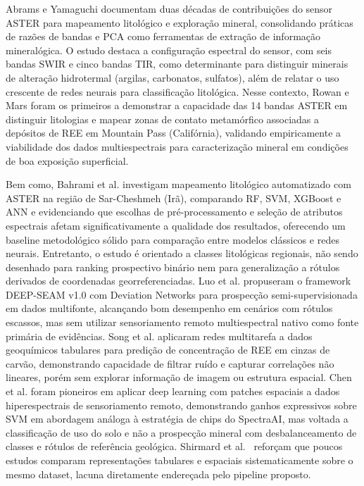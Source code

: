 \documentclass[12pt,twocolumn]{article}
\begin{document}
Abrams e Yamaguchi \cite{abrams2019} documentam duas décadas de contribuições do sensor ASTER para mapeamento litológico e exploração mineral, consolidando práticas de razões de bandas e PCA como ferramentas de extração de informação mineralógica. O estudo destaca a configuração espectral do sensor, com seis bandas SWIR e cinco bandas TIR, como determinante para distinguir minerais de alteração hidrotermal (argilas, carbonatos, sulfatos), além de relatar o uso crescente de redes neurais para classificação litológica. Nesse contexto, Rowan e Mars \cite{rowan2003} foram os primeiros a demonstrar a capacidade das 14 bandas ASTER em distinguir litologias e mapear zonas de contato metamórfico associadas a depósitos de REE em Mountain Pass (Califórnia), validando empiricamente a viabilidade dos dados multiespectrais para caracterização mineral em condições de boa exposição superficial.

Bem como, Bahrami et al. \cite{bahrami2024} investigam mapeamento litológico automatizado com ASTER na região de Sar-Cheshmeh (Irã), comparando RF, SVM, XGBoost e ANN e evidenciando que escolhas de pré-processamento e seleção de atributos espectrais afetam significativamente a qualidade dos resultados, oferecendo um baseline metodológico sólido para comparação entre modelos clássicos e redes neurais. Entretanto, o estudo é orientado a classes litológicas regionais, não sendo desenhado para ranking prospectivo binário nem para generalização a rótulos derivados de coordenadas georreferenciadas. Luo et al. \cite{luo2025} propuseram o framework DEEP-SEAM v1.0 com Deviation Networks para prospecção semi-supervisionada em dados multifonte, alcançando bom desempenho em cenários com rótulos escassos, mas sem utilizar sensoriamento remoto multiespectral nativo como fonte primária de evidências. Song et al. \cite{song2024} aplicaram redes multitarefa a dados geoquímicos tabulares para predição de concentração de REE em cinzas de carvão, demonstrando capacidade de filtrar ruído e capturar correlações não lineares, porém sem explorar informação de imagem ou estrutura espacial. Chen et al. \cite{chen2014} foram pioneiros em aplicar deep learning com patches espaciais a dados hiperespectrais de sensoriamento remoto, demonstrando ganhos expressivos sobre SVM em abordagem análoga à estratégia de chips do SpectraAI, mas voltada a classificação de uso do solo e não a prospecção mineral com desbalanceamento de classes e rótulos de referência geológica. Shirmard et al.\ \cite{shirmard2022} reforçam que poucos estudos comparam representações tabulares e espaciais sistematicamente sobre o mesmo dataset, lacuna diretamente endereçada pelo pipeline proposto.
\end{document}
